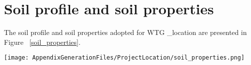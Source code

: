 

\chapter{Soil profile and soil properties}\label{sec_1}

The soil profile and soil properties adopted for WTG {\ID_location} are presented in Figure ~\ref{soil_properties}.



\begin{sidewaysfigure} %
\texttt{[image: AppendixGenerationFiles/ProjectLocation/soil\_properties.png]}
\caption{Soil profile and soil properties for WTG {\ID_location}, after rev. 5 of Soils and Foundation Expertise report.}
\label{soil_properties}\end{sidewaysfigure}
